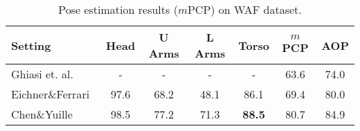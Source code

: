 \tabcolsep 1.5pt
\begin{table}[tbp]
 \scriptsize
  \centering
  \begin{tabular}{@{} l c cc cc |c@{}}
    \toprule
    Setting& Head   & U Arms  & L Arms & Torso & $m$PCP  & AOP \\
    \midrule
    
    
    \midrule
    
    
    \midrule
    Ghiasi et. al.~\cite{ghiasi14cvpr}  & -      & -      & -      & -         & 63.6  &  74.0 \\
    Eichner\&Ferrari~\cite{eichner10eccv}   & 97.6   & 68.2  &   48.1     &86.1    &69.4   & 80.0 \\
    Chen\&Yuille~\cite{Chen:2015:POC}  & 98.5 &   77.2 &  71.3 &   \textbf{88.5} &   80.7 &   84.9 \\
    \bottomrule
  \end{tabular}
    \vspace{0.1em}
  \caption[]{Pose estimation results ($m$PCP) on WAF dataset.}
    \vspace{-1.0em}
  \label{tab:multicut:waf}
\end{table}
